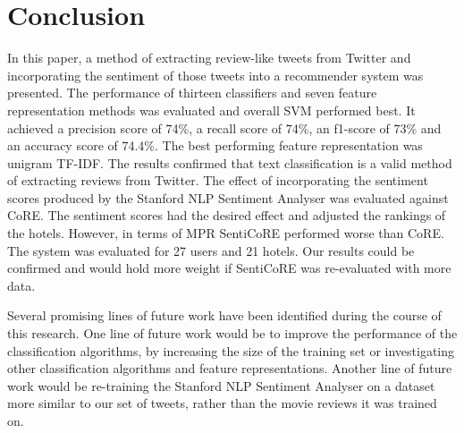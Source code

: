 \section{Conclusion}

In this paper, a method of extracting review-like tweets from Twitter and incorporating the sentiment of those tweets into a recommender system was presented. The performance of thirteen classifiers and seven feature representation methods was evaluated and overall SVM performed best. It achieved a precision score of 74\%, a recall score of 74\%, an f1-score of 73\% and an accuracy score of 74.4\%. The best performing feature representation was unigram TF-IDF. The results confirmed that text classification is a valid method of extracting reviews from Twitter. The effect of incorporating the sentiment scores produced by the Stanford NLP Sentiment Analyser was evaluated against CoRE. The sentiment scores had the desired effect and adjusted the rankings of the hotels. However, in terms of MPR SentiCoRE performed worse than CoRE. The system was evaluated for 27 users and 21 hotels. Our results could be confirmed and would hold more weight if SentiCoRE was re-evaluated with more data.

Several promising lines of future work have been identified during the course of this research. One line of future work would be to improve the performance of the classification algorithms, by increasing the size of the training set or investigating other classification algorithms and feature representations. Another line of future work would be re-training the Stanford NLP Sentiment Analyser on a dataset more similar to our set of tweets, rather than the movie reviews it was trained on. 

